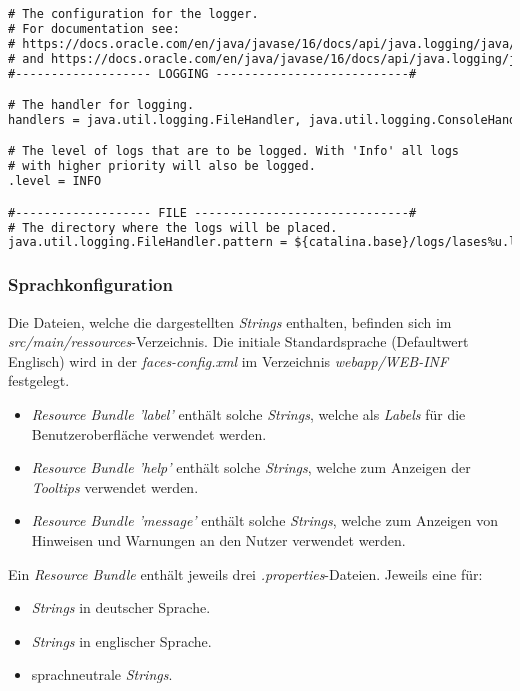 \begin{lstlisting}[language=XML, caption = Die Loggingkonfiguration \emph{logger.properties}]
# The configuration for the logger.
# For documentation see:
# https://docs.oracle.com/en/java/javase/16/docs/api/java.logging/java/util/logging/FileHandler.html
# and https://docs.oracle.com/en/java/javase/16/docs/api/java.logging/java/util/logging/ConsoleHandler.html
#------------------- LOGGING ---------------------------#

# The handler for logging.
handlers = java.util.logging.FileHandler, java.util.logging.ConsoleHandler

# The level of logs that are to be logged. With 'Info' all logs
# with higher priority will also be logged.
.level = INFO

#------------------- FILE ------------------------------#
# The directory where the logs will be placed.
java.util.logging.FileHandler.pattern = ${catalina.base}/logs/lases%u.log
\end{lstlisting}

\subsubsection{Sprachkonfiguration}
Die Dateien, welche die dargestellten \emph{Strings} enthalten, befinden sich im
\emph{src/main/ressources}-Verzeichnis.
Die initiale Standardsprache (Defaultwert Englisch) wird in der \emph{faces-config.xml} im
Verzeichnis \emph{webapp/WEB-INF} festgelegt.

\begin{itemize}
    \item \emph{Resource Bundle 'label'} enthält solche \emph{Strings}, welche als \emph{Labels} für die Benutzeroberfläche verwendet
    werden.
    \item \emph{Resource Bundle 'help'} enthält solche \emph{Strings}, welche zum Anzeigen der \emph{Tooltips} verwendet
    werden.
    \item \emph{Resource Bundle 'message'} enthält solche \emph{Strings}, welche zum Anzeigen von Hinweisen und Warnungen
    an den Nutzer verwendet werden.
\end{itemize}

Ein \emph{Resource Bundle} enthält jeweils drei \emph{.properties}-Dateien.
Jeweils eine für:
\begin{itemize}
    \item \emph{Strings} in deutscher Sprache.
    \item \emph{Strings} in englischer Sprache.
    \item sprachneutrale \emph{Strings}.
\end{itemize}

